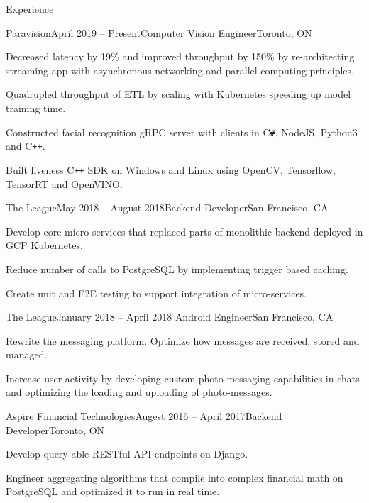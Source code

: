\documentclass{resume}
\begin{document}
  \begin{rSection}{Experience}

    \begin{rSubsection}{Paravision}{April 2019 – Present}{Computer Vision Engineer}{Toronto, ON}
    \item Decreased latency by 19\% and improved throughput by 150\% by re-architecting streaming app with asynchronous networking and parallel computing principles.
    \item Quadrupled throughput of ETL by scaling with Kubernetes speeding up model training time.
    \item Constructed facial recognition gRPC server with clients in C\texttt{\#}, NodeJS, Python3 and C\texttt{++}.
    \item Built liveness C\texttt{++} SDK on Windows and Linux using OpenCV, Tensorflow, TensorRT and OpenVINO.
    \end{rSubsection}
    \vspace{-1em}
    \begin{rSubsection}{The League}{May 2018 – August 2018}{Backend Developer}{San Francisco, CA}
    \item Develop core micro-services that replaced parts of monolithic backend deployed in GCP Kubernetes.
    \item Reduce number of calls to PostgreSQL by implementing trigger based caching.
    \item Create unit and E2E testing to support integration of micro-services.
    \end{rSubsection}
    \vspace{-1em}
    \begin{rSubsection}{The League}{January 2018 – April 2018 }{Android Engineer}{San Francisco, CA}
    \item Rewrite the messaging platform. Optimize how messages are received, stored and managed.
    \item Increase user activity by developing custom photo-messaging capabilities in chats and optimizing the loading and uploading of photo-messages.
    \end{rSubsection}
    \vspace{-1em}
    \begin{rSubsection}{Aspire Financial Technologies}{Augest 2016 – April 2017}{Backend Developer}{Toronto, ON}
    \item Develop query-able RESTful API endpoints on Django.
    \item Engineer aggregating algorithms that compile into complex financial math on PostgreSQL and optimized it to run in real time.
    \end{rSubsection}
  \end{rSection}
\end{document}
